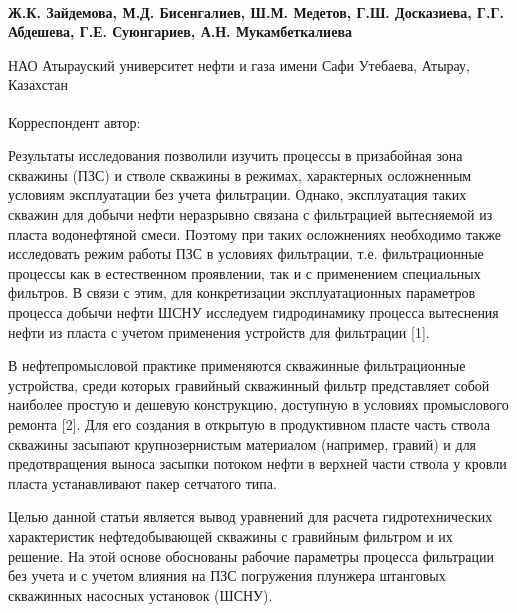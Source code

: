 
\begin{articleheader}

{\bfseries
Ж.К. Зайдемова,
М.Д. Бисенгалиев\textsuperscript{\envelope },
Ш.М. Медетов,
Г.Ш. Досказиева,
Г.Г. Абдешева,
Г.Е. Суюнгариев,
А.Н. Мукамбеткалиева
}
\end{articleheader}

\begin{affiliation}
НАО Атырауский университет нефти и газа имени Сафи Утебаева, Атырау, Казахстан

\raggedright \textsuperscript{\envelope } Корреспондент автор: \href{mailto:maks_bisengali@mail.ru}{}
\end{affiliation}

Результаты исследования позволили изучить процессы в призабойная зона
скважины (ПЗС) и стволе скважины в режимах, характерных осложненным
условиям эксплуатации без учета фильтрации. Однако, эксплуатация таких
скважин для добычи нефти неразрывно связана с фильтрацией вытесняемой из
пласта водонефтяной смеси. Поэтому при таких осложнениях необходимо
также исследовать режим работы ПЗС в условиях фильтрации, т.е.
фильтрационные процессы как в естественном проявлении, так и с
применением специальных фильтров. В связи с этим, для конкретизации
эксплуатационных параметров процесса добычи нефти ШСНУ исследуем
гидродинамику процесса вытеснения нефти из пласта с учетом применения
устройств для фильтрации {[}1{]}.

В нефтепромысловой практике применяются скважинные фильтрационные
устройства, среди которых гравийный скважинный фильтр представляет собой
наиболее простую и дешевую конструкцию, доступную в условиях
промыслового ремонта {[}2{]}. Для его создания в открытую в продуктивном
пласте часть ствола скважины засыпают крупнозернистым материалом
(например, гравий) и для предотвращения выноса засыпки потоком нефти в
верхней части ствола у кровли пласта устанавливают пакер сетчатого типа.

Целью данной статьи является вывод уравнений для расчета
гидротехнических характеристик нефтедобывающей скважины с гравийным
фильтром и их решение. На этой основе обоснованы рабочие параметры
процесса фильтрации без учета и с учетом влияния на ПЗС погружения
плунжера штанговых скважинных насосных установок (ШСНУ).

